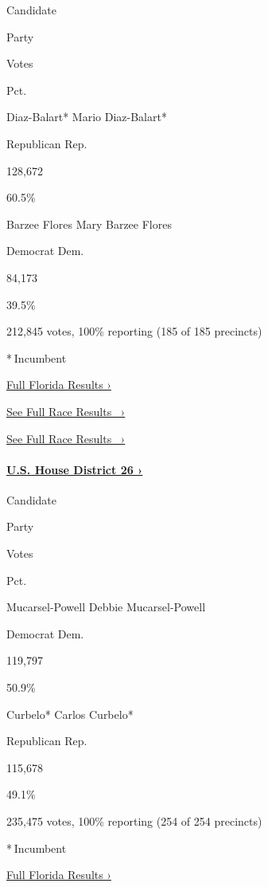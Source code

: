 Candidate

Party

Votes

Pct.

 Diaz-Balart* Mario Diaz-Balart*

Republican Rep.

128,672

60.5\%

 Barzee Flores Mary Barzee Flores

Democrat Dem.

84,173

39.5\%

212,845 votes, 100\% reporting (185 of 185 precincts)

* Incumbent

\href{https://www.nytimes3xbfgragh.onion/interactive/2018/11/06/us/elections/results-florida-elections.html}{Full
Florida Results ›}

\href{https://www.nytimes3xbfgragh.onion/elections/results/florida-house-district-25}{See
Full Race Results~ ›}

\href{https://www.nytimes3xbfgragh.onion/elections/results/florida-house-district-25}{See
Full Race Results~ ›}

\hypertarget{us-house-district-26-}{%
\paragraph{\texorpdfstring{\href{https://www.nytimes3xbfgragh.onion/elections/results/florida-house-district-26}{U.S.
House District 26
›}}{U.S. House District 26 ›}}\label{us-house-district-26-}}

Candidate

Party

Votes

Pct.

 Mucarsel-Powell Debbie Mucarsel-Powell

Democrat Dem.

119,797

50.9\%

 Curbelo* Carlos Curbelo*

Republican Rep.

115,678

49.1\%

235,475 votes, 100\% reporting (254 of 254 precincts)

* Incumbent

\href{https://www.nytimes3xbfgragh.onion/interactive/2018/11/06/us/elections/results-florida-elections.html}{Full
Florida Results ›}

